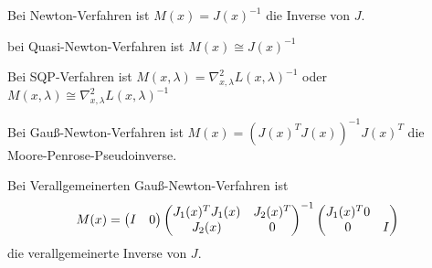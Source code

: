 \bitm
\item Bei Newton-Verfahren ist $M(x) = J(x)^{-1}$ die Inverse von $J$.
\item bei Quasi-Newton-Verfahren ist $M(x) \cong J(x)^{-1}$
\item Bei SQP-Verfahren ist $M(x, \lambda) = \nabla_{x,\lambda}^2 L(x, \lambda)^{-1}$ oder 
$M(x, \lambda) \cong \nabla_{x,\lambda}^2 L(x, \lambda)^{-1}$
\item Bei Gauß-Newton-Verfahren ist $M(x) = (J(x)^T J(x))^{-1} J(x)^T$ die Moore-Penrose-Pseudoinverse.
\item Bei Verallgemeinerten Gauß-Newton-Verfahren ist \[ M(x) = \begin{pmatrix} I & 0 \end{pmatrix} \begin{pmatrix} J_1(x)^T J_1(x) & J_2(x)^T \\ J_2(x) & 0 \end{pmatrix}^{-1} \begin{pmatrix} J_1(x)^T 0 \\ 0 & I \end{pmatrix} \] die verallgemeinerte Inverse von $J$.
\eitm
































































































